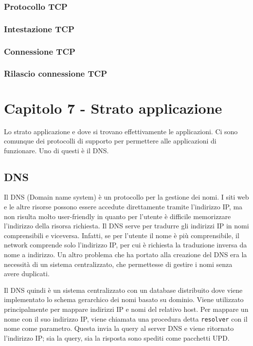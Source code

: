 \subsubsection{Protocollo TCP}


\subsubsection{Intestazione TCP}


\subsubsection{Connessione TCP}


\subsubsection{Rilascio connessione TCP}


\newpage
\section{Capitolo 7 - Strato applicazione}

Lo strato applicazione e dove si trovano effettivamente le applicazioni.
Ci sono comunque dei protocolli di supporto per permettere alle applicazioni di funzionare.
Uno di questi è il DNS.

\subsection{DNS}

Il DNS (Domain name system) è un protocollo per la gestione dei nomi.
I siti web e le altre risorse possono essere accedute direttamente tramite l'indirizzo IP,
ma non risulta molto user-friendly in quanto per l'utente è difficile memorizzare l'indirizzo della risorsa richiesta.
Il DNS serve per tradurre gli indirizzi IP in nomi comprensibili e viceversa.
Infatti, se per l'utente il nome è più comprensibile, il network comprende solo l'indirizzo IP, per cui è richiesta la traduzione inversa da nome a indirizzo.
Un altro problema che ha portato alla creazione del DNS era la necessità di un sistema centralizzato, che permettesse di gestire i nomi senza avere duplicati.

Il DNS quindi è un sistema centralizzato con un database distribuito dove viene implementato lo schema gerarchico dei nomi basato su dominio. 
Viene utilizzato principalmente per mappare indirizzi IP e nomi del relativo host.
Per mappare un nome con il suo indirizzo IP, viene chiamata una procedura detta \texttt{resolver} con il nome come parametro.
Questa invia la query al server DNS e viene ritornato l'indirizzo IP; sia la query, sia la risposta sono spediti come pacchetti UPD.

